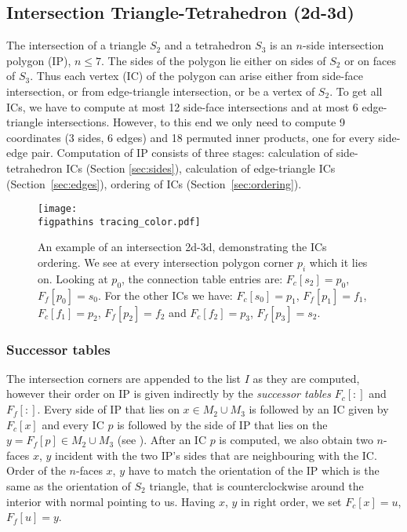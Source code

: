 \subsection{Intersection Triangle-Tetrahedron (2d-3d)}
The intersection of a triangle $S_2$ and a tetrahedron $S_3$ is an $n$-side intersection polygon (IP), $n\le 7$. The sides of the polygon
lie either on sides of $S_2$ or on faces of $S_3$. Thus each vertex (IC) of the polygon
can arise either from side-face intersection, or from edge-triangle intersection, or be a vertex of $S_2$.
To get all ICs, we have to compute at most 12 side-face intersections and at most 6 edge-triangle intersections. However,
to this end we only need to compute 9 \plucker coordinates (3 sides, 6 edges) and 18 permuted inner products, one for every side-edge pair.
Computation of IP consists of three stages: calculation of side-tetrahedron ICs (Section \ref{sec:sides}), 
calculation of edge-triangle ICs (Section~\ref{sec:edges}), ordering of ICs (Section~\ref{sec:ordering}).

\begin{figure}[!htb]
    \centering    
    \texttt{[image: \\figpathins tracing\_color.pdf]}
    \caption[Intersection 2d-3d example -- ICs ordering.]
    {An example of an intersection 2d-3d, demonstrating the ICs ordering. We see at every 
    intersection polygon corner $p_i$ which \nfaces it lies on. Looking at $p_0$, the connection table entries
    are: $F_c[s_2]=p_0$, $F_f[p_0]=s_0$. For the other ICs we have: $F_c[s_0]=p_1$, $F_f[p_1]=f_1$, $F_c[f_1]=p_2$, $F_f[p_2]=f_2$ and $F_c[f_2]=p_3$, $F_f[p_3]=s_2$.}
    \label{fig:tracing}
\end{figure}

\subsubsection{Successor tables}
The intersection corners are appended to the list $I$ as they are computed, however their order on IP is 
given indirectly by the \emph{successor tables} $F_c[:]$ and $F_f[:]$. Every side of IP that lies on \nface $x\in M_2\cup M_3$ is followed by an 
IC given by $F_c[x]$ and every IC $p$ is followed by the side of IP that lies on the \nface $y=F_f[p]\in M_2\cup M_3$ (see ).
After an IC $p$ is computed, we also obtain two $n$-faces $x$, $y$ incident with the two IP's sides that are neighbouring with the IC. 
Order of the $n$-faces $x$, $y$ have to match the orientation of the IP which is the same as the orientation of $S_2$ triangle, 
that is counterclockwise around the interior with normal pointing to us.
Having $x$, $y$ in right order, we set $F_c[x]=u$, $F_f[u]=y$.

